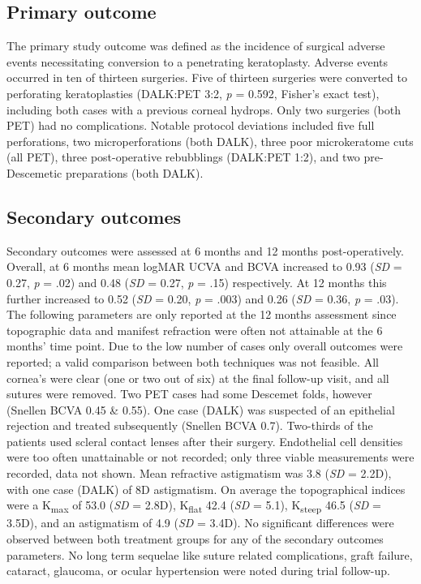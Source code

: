 \documentclass[authordate, empirical]{jote-new-article}
\begin{document}
	\subsection{Primary outcome}



	The primary study outcome was defined as the incidence of surgical adverse events necessitating conversion to a penetrating keratoplasty. Adverse events occurred in ten of thirteen surgeries. Five of thirteen surgeries were converted to perforating keratoplasties (DALK:PET 3:2, \emph{p} = 0.592, Fisher's exact test), including both cases with a previous corneal hydrops. Only two surgeries (both PET) had no complications. Notable protocol deviations included five full perforations, two microperforations (both DALK), three poor microkeratome cuts (all PET), three post-operative rebubblings (DALK:PET 1:2), and two pre-Descemetic preparations (both DALK).



	\subsection{Secondary outcomes}



	Secondary outcomes were assessed at 6 months and 12 months post-operatively. Overall, at 6 months mean logMAR UCVA and BCVA increased to 0.93 (\emph{SD }=\emph{ }0.27, \emph{p }= .02) and 0.48 (\emph{SD }=\emph{ }0.27, \emph{p} = .15) respectively. At 12 months this further increased to 0.52 (\emph{SD }=\emph{ }0.20, \emph{p }= .003) and 0.26 (\emph{SD }=\emph{ }0.36, \emph{p }= .03). The following parameters are only reported at the 12 months assessment since topographic data and manifest refraction were often not attainable at the 6 months' time point. Due to the low number of cases only overall outcomes were reported; a valid comparison between both techniques was not feasible. All cornea's were clear (one or two out of six) at the final follow-up visit, and all sutures were removed. Two PET cases had some Descemet folds, however (Snellen BCVA 0.45 \& 0.55). One case (DALK) was suspected of an epithelial rejection and treated subsequently (Snellen BCVA 0.7). Two-thirds of the patients used scleral contact lenses after their surgery. Endothelial cell densities were too often unattainable or not recorded; only three viable measurements were recorded, data not shown. Mean refractive astigmatism was 3.8 (\emph{SD }=\emph{ }2.2D), with one case (DALK) of 8D astigmatism. On average the topographical indices were a K\textsubscript{max} of 53.0 (\emph{SD }=\emph{ }2.8D), K\textsubscript{flat} 42.4 (\emph{SD }= 5.1), K\textsubscript{steep }46.5 (\emph{SD }= 3.5D), and an astigmatism of 4.9 (\emph{SD }= 3.4D). No significant differences were observed between both treatment groups for any of the secondary outcomes parameters. No long term sequelae like suture related complications, graft failure, cataract, glaucoma, or ocular hypertension were noted during trial follow-up.
\end{document}
